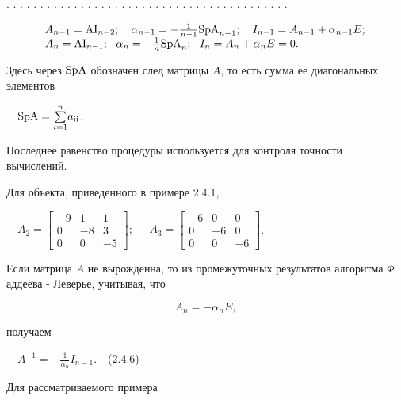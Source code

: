 		. . . . . . . . . . . . . . . . . . . . . . . . . . . . . . . . . . . . . . . . . .


\begin{equation*}
\begin{matrix}A_{n-1}=\normalsubformula{\text{AI}}_{n-2};\ \ \ \alpha _{n-1}=-\frac
1{n-1}\normalsubformula{\text{SpA}}_{n-1};\ \ \ I_{n-1}=A_{n-1}+\alpha _{n-1}E;\hfill\null
\\A_n=\normalsubformula{\text{AI}}_{n-1};\ \ \alpha _n=-\frac 1
n\normalsubformula{\text{SpA}}_n;\ \ I_n=A_n+\alpha _nE=0.\hfill\null \end{matrix}\hfill 
\end{equation*}

		Здесь через  $\normalsubformula{\text{SpA}}$ обозначен след матрицы  $A$, то есть сумма ее диагональных элементов



		\ \  $\normalsubformula{\text{SpA}}=\overset n{\underset{i=1}{\sum }}a_{\normalsubformula{\text{ii}}}$.



		Последнее равенство процедуры используется для контроля точности вычислений.



		Для объекта, приведенного в примере 2.4.1,



		\ \ 
		$A_2=\left[\begin{matrix}-9&1&1\\0&-8&3\\0&0&-5\end{matrix}\right];\;\;\;\;\;A_3=\left[\begin{matrix}-6&0&0\\0&-6&0\\0&0&-6\end{matrix}\right]$.



		Если матрица  $A$ не вырожденна, то из промежуточных результатов алгоритма $ \Phi $ аддеева - Леверье, учитывая, что


\begin{equation*}
A_n=-\alpha _nE,
\end{equation*}

		получаем



		\ \  $A^{-1}=-\frac 1{\alpha _n}I_{n-1}$.\ \ (2.4.6)



		Для рассматриваемого примера



